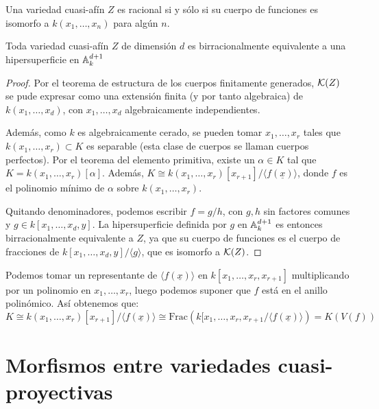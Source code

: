 \documentclass[ACGA.tex]{subfiles}
\begin{document}
\begin{coro}
 Una variedad cuasi-afín $Z$ es racional si y sólo si su cuerpo de funciones es isomorfo a $k(x_1,\ldots,x_n)$ para algún $n$.
\end{coro}

\begin{coro}\label{behipersuperficie}
 Toda variedad cuasi-afín $Z$ de dimensión $d$ es birracionalmente equivalente a una hipersuperficie en $\mathbb{A}^{d+1}_k$
\end{coro}

\begin{proof} Por el teorema de estructura de los cuerpos finitamente generados, ${\mathcal K}(Z)$ se pude expresar como una extensión finita (y por tanto algebraica) de $k(x_1,\ldots,x_d)$, con $x_1,\dots,x_d$ algebraicamente independientes.

Además, como $k$ es algebraicamente cerado, se pueden tomar $x_1,\dots,x_r$ tales que $k(x_1,\dots,x_r) \subset K$ es separable (esta clase de cuerpos se llaman cuerpos perfectos). Por el teorema del elemento primitiva, existe un $α \in K$ tal que $K = k(x_1,\dots,x_r)[α]$. Además, $K \cong k(x_1,\dots,x_r)[x_{r+1}]/\langle f(\underline{x})\rangle$, donde $f$ es el polinomio mínimo de $α$ sobre $k(x_1,\dots,x_r)$. 

Quitando denominadores, podemos escribir $f=g/h$, con $g,h$ sin factores comunes y $g\in k[x_1,\ldots,x_d,y]$. La hipersuperficie definida por $g$ en $\mathbb{A}^{d+1}_k$ es entonces birracionalmente equivalente a $Z$, ya que su cuerpo de funciones es el cuerpo de fracciones de $k[x_1,\ldots,x_d,y]/\langle g\rangle$, que es isomorfo a ${\mathcal K}(Z)$.
\end{proof}

\begin{nota}
Podemos tomar un representante de $\langle f(\underline{x}) \rangle$ en $k[x_1,\dots,x_r,x_{r+1}]$ multiplicando por un polinomio en $x_1,\dots,x_r$, luego podemos suponer que $f$ está en el anillo polinómico. Así obtenemos que:
\[ K \cong k(x_1,\dots,x_r)[x_{r+1}]/\langle f(\underline{x}) \rangle \cong \text{Frac}\left( k[x_1,\dots,x_r,x_{r+1} / \langle f(\underline{x})\rangle \right) = K(V(f)) \]
\end{nota}




 




\section{Morfismos entre variedades cuasi-proyectivas}
\end{document}
